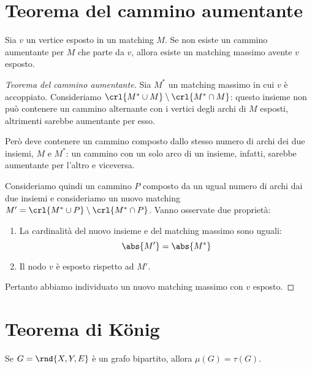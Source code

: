 \documentclass[\main/main.tex]{subfiles}
\begin{document}
\section{Teorema del cammino aumentante}

\begin{theorem}
  Sia \(v\) un vertice esposto in un matching \(M\). Se non esiste un cammino aumentante per \(M\) che parte da \(v\), allora esiste un matching massimo avente \(v\) esposto.
\end{theorem}

\begin{proof}[Teorema del cammino aumentante]
  Sia \(M^*\) un matching massimo in cui \(v\) è accoppiato. Consideriamo \(\crl{M^*\cup M}\setminus\crl{M^* \cap M}\): questo insieme non può contenere un cammino alternante con i vertici degli archi di \(M\) esposti, altrimenti sarebbe aumentante per esso.

  Però deve contenere un cammino composto dallo stesso numero di archi dei due insiemi, \(M\) e \(M^*\): un cammino con un solo arco di un insieme, infatti, sarebbe aumentante per l'altro e viceversa.

  Consideriamo quindi un cammino \(P\) composto da un ugual numero di archi dai due insiemi e consideriamo un nuovo matching \(M' = \crl{M^*\cup P}\setminus\crl{M^* \cap P}\). Vanno osservate due proprietà:

  \begin{enumerate}
    \item La cardinalità del nuovo insieme e del matching massimo sono uguali:
          \[
            \abs{M'} = \abs{M^*}
          \]
    \item Il nodo \(v\) è esposto rispetto ad \(M'\).
  \end{enumerate}
  Pertanto abbiamo individuato un nuovo matching massimo con \(v\) esposto.
\end{proof}

\section{Teorema di König}

\begin{theorem}
  Se \(G=\rnd{X, Y, E}\) è un grafo bipartito, allora \(\mu(G) = \tau(G)\).
\end{theorem}
\end{document}
